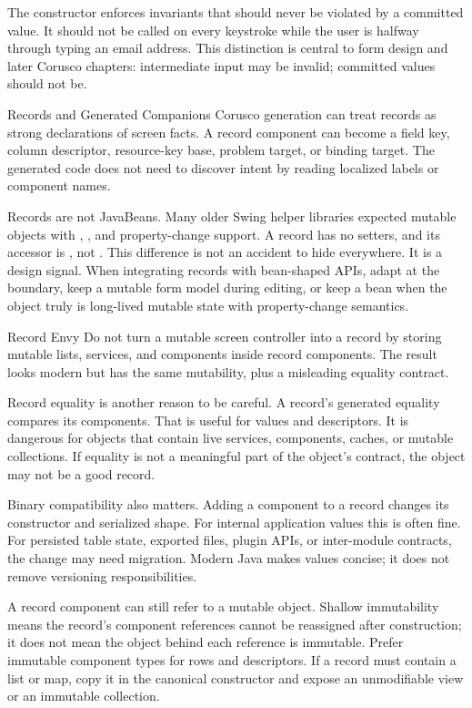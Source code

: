 The constructor enforces invariants that should never be violated by a committed value. It should not be called on every keystroke while the user is halfway through typing an email address. This distinction is central to form design and later Corusco chapters: intermediate input may be invalid; committed values should not be.

\begin{coruscobox}{Records and Generated Companions}
Corusco generation can treat records as strong declarations of screen facts. A record component can become a field key, column descriptor, resource-key base, problem target, or binding target. The generated code does not need to discover intent by reading localized labels or component names.
\end{coruscobox}

Records are not JavaBeans. Many older Swing helper libraries expected mutable objects with , , and property-change support. A record has no setters, and its accessor is , not . This difference is not an accident to hide everywhere. It is a design signal. When integrating records with bean-shaped APIs, adapt at the boundary, keep a mutable form model during editing, or keep a bean when the object truly is long-lived mutable state with property-change semantics.

\begin{pitfallbox}{Record Envy}
Do not turn a mutable screen controller into a record by storing mutable lists, services, and components inside record components. The result looks modern but has the same mutability, plus a misleading equality contract.
\end{pitfallbox}

Record equality is another reason to be careful. A record's generated equality compares its components. That is useful for values and descriptors. It is dangerous for objects that contain live services, components, caches, or mutable collections. If equality is not a meaningful part of the object's contract, the object may not be a good record.

Binary compatibility also matters. Adding a component to a record changes its constructor and serialized shape. For internal application values this is often fine. For persisted table state, exported files, plugin APIs, or inter-module contracts, the change may need migration. Modern Java makes values concise; it does not remove versioning responsibilities.

A record component can still refer to a mutable object. Shallow immutability means the record's component references cannot be reassigned after construction; it does not mean the object behind each reference is immutable. Prefer immutable component types for rows and descriptors. If a record must contain a list or map, copy it in the canonical constructor and expose an unmodifiable view or an immutable collection.

